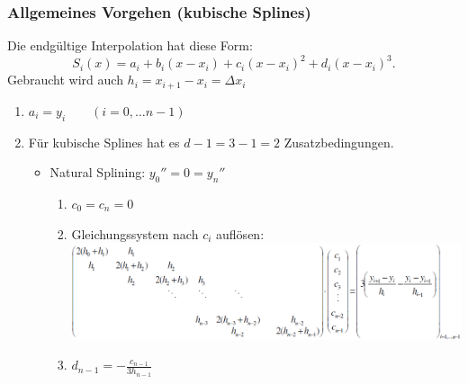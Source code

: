 \subsubsection{Allgemeines Vorgehen (kubische Splines)}
Die endgültige Interpolation hat diese Form:
$$\boxed{S_i(x) = a_i + b_i(x-x_i) + c_i(x-x_i)^2 + d_i(x-x_i)^3}.$$
Gebraucht wird auch $h_i = x_{i+1} - x_i = \Delta x_i$ 
\begin{enumerate}
  \item $a_i = y_i \qquad (i=0,\ldots n-1)$
  \item Für kubische Splines hat es $d-1=3-1=2$ Zusatzbedingungen.
    \begin{itemize}
      \item Natural Splining:
      $y_0''=0=y_n''$
        \begin{enumerate}
          \item $c_0 = c_n = 0$
          \item Gleichungssystem nach $c_i$ auflösen:\\
            \includegraphics[width=13cm]{./bilder/1d_spline_natural_gleichungssystem}
          \item $d_{n-1} = -\frac{c_{n-1}}{3h_{n-1}}$
        \end{enumerate}
        

\end{itemize}
\end{enumerate}
